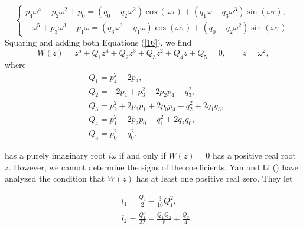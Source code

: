 \documentclass{CMHPhD-SIVD}
\begin{document}
\begin{equation}\label{16}
\left\{
   \begin{array}{ll}
    p_4\omega^{4}-p_{2}\omega^{2}+p_0=(q_0-q_2 \omega^{2})\cos(\omega\tau)+(q_1\omega-q_3\omega^{3})  \sin(\omega\tau),\\
    -\omega^{5}+p_3 \omega^{3}
    -p_1 \omega=(q_3\omega^{3}-q_1\omega) \cos(\omega\tau)+ (q_0-q_2 \omega^{2})\sin(\omega\tau).
   \end{array}
\right.
\end{equation}
Squaring and adding both Equations (\ref{16}), we find
\begin{equation}\label{17}
W(z)=z^5+Q_1 z^4+Q_2 z^3+Q_3 z^2+Q_4 z+Q_5=0,  \qquad  z=\omega^2,
\end{equation}
where
\begin{align*}
&Q_1=p_4^2 - 2 p_3,\\
&Q_2=-2p_1+ p_3^2- 2 p_2 p_4-q_3^2,\\
&Q_3=p_2^2 +2 p_3 p_1 + 2 p_0 p_4- q_2^2+ 2 q_1 q_3,\\
&Q_4=p_1^2 - 2 p_2 p_0 - q_1^2 + 2 q_2 q_0,\\
&Q_5=p_0^2 - q_0^2.
\end{align*}


 has a purely imaginary root $i \omega$ if and only if $W(z) = 0$ has a
positive real root $z$. However, we cannot determine the signs of the coefficients. Yan and Li (\cite{yan2006stability}) have analyzed the condition that $W(z)$ has at least one positive real zero. They let

\begin{align*}
&l_1=\frac{Q_2}{2}-\frac{3}{16}Q_1^2,\\
&l_2=\frac{Q_1^3}{32}-\frac{Q_1 Q_2}{8}+\frac{Q_3}{4}.
\end{align*}
\end{document}
